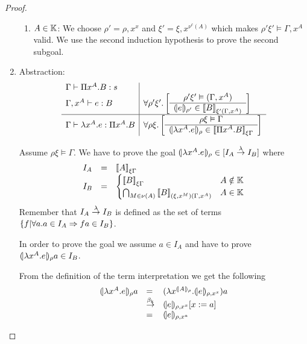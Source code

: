 \begin{theorem}
\begin{proof}
\begin{enumerate}
\begin{enumerate}
            \item $A \in \mathbb{K}$:
                We choose $\rho' = \rho, x^x$ and $\xi' = \xi,x^{\nu^c(A)}$
                    which makes $\rho'\xi' \vDash \Gamma,x^A$ valid. We use the
                    second induction hypothesis to prove the second subgoal.
            \end{enumerate}

        \item Abstraction:
            $$
            \begin{array}{l|l}
                \Gamma \vdash \Pi x^A.B : s
                \\
                \Gamma, x^A \vdash e : B
                &
                \goal {\rho'} {\xi'} {(\Gamma,x^A)} e B
                \\
                \hline
                \Gamma \vdash \lambda x^A.e : \Pi x^A. B
                &
                \goal \rho \xi \Gamma {\lambda x^A.e} {\Pi x^A.B}
            \end{array}
            $$

            Assume $\rho\xi \vDash \Gamma$. We have to prove the goal
            ${(\!|\lambda x^A.e|\!)_{\rho}} \in [I_A \stackrel{\lambda}{\to} I_B]$ where
            $$
            \begin{array}{lll}
                I_A &=& {{[\![} A{]\!]}}_{\xi\Gamma}
                \\
                I_B &=&
                \begin{cases}
                    {{[\![}B{]\!]}}_{\xi\Gamma}
                    &
                    A \notin \mathbb{K}
                    \\
                    \bigcap_{M \in \nu(A)}
                    {{[\![} B{]\!]}}_{(\xi,x^M)(\Gamma,x^A)}
                    &
                    A \in \mathbb{K}
                \end{cases}
            \end{array}
            $$
            Remember that $I_A \stackrel{\lambda}{\to} I_B$ is defined as the set of terms
            ${\{f | \forall a. a \in I_A \Rightarrow f a \in I_B\}}$.

            In order to prove the goal we assume $a \in I_A$ and have to prove
            ${(\!|\lambda x^A. e|\!)_{\rho}} a \in I_B$.

            From the definition of the term interpretation we get the following
            $$
            \begin{array}{lll}
                \terminter{\lambda x^A. e}{\rho} a
                &=&
                (\lambda x^{\terminter{A}{\rho}}. \terminter{e}{\rho,x^x}) a
                \\
                &\keyreduce&
                \terminter{e}{\rho,x^x} [x:=a]
                \\
                &=&
                \terminter{e}{\rho,x^a}
            \end{array}
            $$


\end{enumerate}
\end{proof}
\end{theorem}
